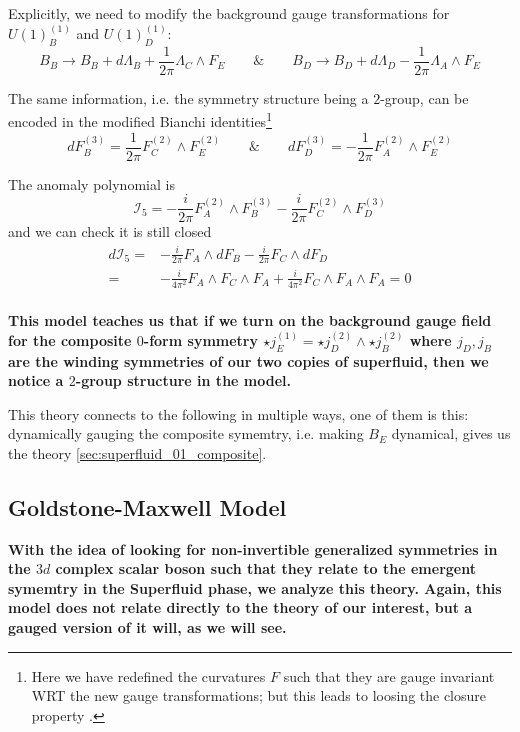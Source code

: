 \documentclass[aps,preprint,nofootinbib,preprintnumbers,eqsecnum,superscriptaddress]{revtex4}
\numberwithin{equation}{section}
\begin{document}
Explicitly, we need to modify the background gauge transformations for $U(1)^{(1)}_B$ and $U(1)^{(1)}_D$:
\begin{equation}
B_B \to B_B + d\Lambda_B + \frac{1}{2\pi}\Lambda_C \wedge F_E \qquad \& \qquad B_D \to B_D + d\Lambda_D - \frac{1}{2\pi}\Lambda_A \wedge F_E
\end{equation}

The same information, i.e. the symmetry structure being a $2$-group, can be encoded in the modified Bianchi identities\footnote{Here we have redefined the curvatures $F$ such that they are gauge invariant WRT the new gauge transformations; but this leads to loosing the closure property \cite{C_rdova_2019}.}
\begin{equation}
dF^{(3)}_B = \frac{1}{2\pi} F^{(2)}_C \wedge F^{(2)}_E \qquad \& \qquad dF^{(3)}_D = -\frac{1}{2\pi} F^{(2)}_A \wedge F^{(2)}_E
\end{equation}

The anomaly polynomial is
\begin{equation}\label{eq:anomaly_poly_2superfluids}
\mathcal{I}_5 = -\frac{i}{2\pi} F^{(2)}_A \wedge F^{(3)}_B - \frac{i}{2\pi} F^{(2)}_C \wedge F^{(3)}_D
\end{equation}
and we can check it is still closed
\begin{align}
    d \mathcal{I}_5 
    =&-\frac{i}{2\pi} F_A \wedge dF_B - \frac{i}{2\pi} F_C \wedge dF_D \\
    =&-\frac{i}{4\pi^2} F_A \wedge F_C \wedge F_A + \frac{i}{4\pi^2} F_C \wedge F_A \wedge F_A =0\\
\end{align}

{\bf This model teaches us that if we turn on the background gauge field for the composite $0$-form symmetry $\star j^{(1)}_E = \star j^{(2)}_D \wedge \star j^{(2)}_B$ where $j_D, j_B$ are the winding symmetries of our two copies of superfluid, then we notice a $2$-group structure in the model.}

This theory connects to the following in multiple ways, one of them is this: dynamically gauging the composite symemtry, i.e. making $B_E$ dynamical, gives us the theory \ref{sec:superfluid_01_composite}.


\subsection{Goldstone-Maxwell Model}
{\bf With the idea of looking for non-invertible generalized symmetries in the $3d$ complex scalar boson such that they relate to the emergent symemtry in the Superfluid phase, we analyze this theory. Again, this model does not relate directly to the theory of our interest, but a gauged version of it will, as we will see.}
\end{document}
